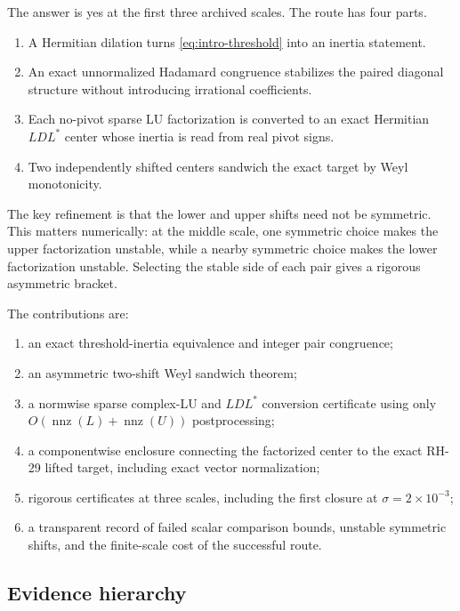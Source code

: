 \documentclass[11pt]{article}
\theoremstyle{definition}
\theoremstyle{remark}
\begin{document}
The answer is yes at the first three archived scales.  The route has four
parts.
\begin{enumerate}
 \item A Hermitian dilation turns \cref{eq:intro-threshold} into an inertia
       statement.
 \item An exact unnormalized Hadamard congruence stabilizes the paired
       diagonal structure without introducing irrational coefficients.
 \item Each no-pivot sparse LU factorization is converted to an exact
       Hermitian $LDL^*$ center whose inertia is read from real pivot signs.
 \item Two independently shifted centers sandwich the exact target by
       Weyl monotonicity.
\end{enumerate}
The key refinement is that the lower and upper shifts need not be symmetric.
This matters numerically: at the middle scale, one symmetric choice makes
the upper factorization unstable, while a nearby symmetric choice makes the
lower factorization unstable.  Selecting the stable side of each pair gives
a rigorous asymmetric bracket.

The contributions are:
\begin{enumerate}
 \item an exact threshold-inertia equivalence and integer pair congruence;
 \item an asymmetric two-shift Weyl sandwich theorem;
 \item a normwise sparse complex-LU and $LDL^*$ conversion certificate using
       only $O(\operatorname{nnz}(L)+\operatorname{nnz}(U))$ postprocessing;
 \item a componentwise enclosure connecting the factorized center to the
       exact RH-29 lifted target, including exact vector normalization;
 \item rigorous certificates at three scales, including the first closure
       at $\sigma=2\times10^{-3}$;
 \item a transparent record of failed scalar comparison bounds, unstable
       symmetric shifts, and the finite-scale cost of the successful route.
\end{enumerate}

\subsection{Evidence hierarchy}
\end{document}
